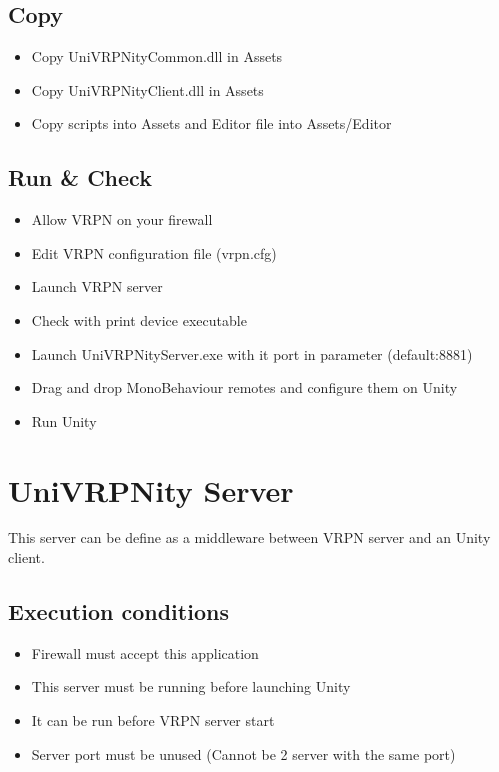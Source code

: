 \documentclass[11pt]{article} %
\begin{document}
\subsection{Copy}
	\begin{itemize}
		\item Copy UniVRPNityCommon.dll in Assets
		\item Copy UniVRPNityClient.dll in Assets 
		\item Copy scripts into Assets and Editor file into Assets/Editor
	\end{itemize}


\subsection{ Run \& Check }
	\begin{itemize}
		\item Allow VRPN on your firewall
		\item Edit VRPN configuration file (vrpn.cfg)
		\item Launch VRPN server
		\item Check with print device executable
		\item Launch UniVRPNityServer.exe with it port in parameter (default:8881)
		\item Drag and drop MonoBehaviour remotes and configure them on Unity
            	\item Run Unity
	\end{itemize}

\section{UniVRPNity Server}
	This server can be define as a middleware between VRPN server and an Unity client.

	\subsection{Execution conditions}
		\begin{itemize}
			\item Firewall must accept this application
 			\item This server must be running before launching Unity
			\item It can be run before VRPN server start
			\item Server port must be unused (Cannot be 2 server with the same port)
		\end{itemize}
\end{document}
